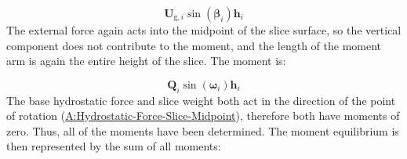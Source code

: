 \documentclass[12pt]{article}
\begin{document}
\begin{displaymath}
{\symbf{U}_{\text{g},i}} \sin\left({\symbf{β}}_{i}\right) {\symbf{h}}_{i}
\end{displaymath}
The external force again acts into the midpoint of the slice surface, so the vertical component does not contribute to the moment, and the length of the moment arm is again the entire height of the slice. The moment is:

\begin{displaymath}
{\symbf{Q}}_{i} \sin\left({\symbf{ω}}_{i}\right) {\symbf{h}}_{i}
\end{displaymath}
The base hydrostatic force and slice weight both act in the direction of the point of rotation (\hyperref[assumpHFSM]{A:Hydrostatic-Force-Slice-Midpoint}), therefore both have moments of zero. Thus, all of the moments have been determined. The moment equilibrium is then represented by the sum of all moments:
\end{document}
